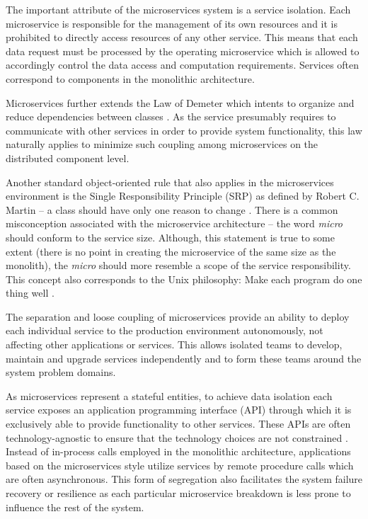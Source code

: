 \documentclass[oneside,
  digital, %
  table,   %
  lof,     %
  lot,     %
]{fithesis3}
\begin{document}
The important attribute of the microservices system is a service isolation. Each microservice is responsible for the management of its own resources and it is prohibited to directly access resources of any other service. This means that each data request must be processed by the operating microservice which is allowed to accordingly control the data access and computation requirements. Services often correspond to components in the monolithic architecture.

Microservices further extends the Law of Demeter which intents to organize and reduce dependencies between classes \cite{law_of_demeter}. As the service presumably requires to communicate with other services in order to provide system functionality, this law naturally applies to minimize such coupling among microservices on the distributed component level. 

Another standard object-oriented rule that also applies in the microservices environment is the Single Responsibility Principle (SRP) as defined by Robert C. Martin -- a class should have only one reason to change \cite{agile_ppp_c}. There is a common misconception associated with the microservice architecture -- the word \textit{micro} should conform to the service size. Although, this statement is true to some extent (there is no point in creating the microservice of the same size  as the monolith), the \textit{micro} should more resemble a scope of the service responsibility. This concept also corresponds to the Unix philosophy: Make each program do one thing well \cite{unix_time_sharing_foreword}.

The separation and loose coupling of microservices provide an ability to deploy each individual service to the production environment autonomously, not affecting other applications or services. This allows isolated teams to develop, maintain and upgrade services independently and to form these teams around the system problem domains. 

As microservices represent a stateful entities, to achieve data isolation each service exposes an application programming interface (API) through which it is exclusively able to provide functionality to other services. These APIs are often technology-agnostic to ensure that the technology choices are not constrained \cite{building_ms}. Instead of in-process calls employed in the monolithic architecture, applications based on the microservices style utilize services by remote procedure calls which are often asynchronous. This form of segregation also facilitates the system failure recovery or resilience as each particular microservice breakdown is less prone to influence the rest of the system.
\end{document}
